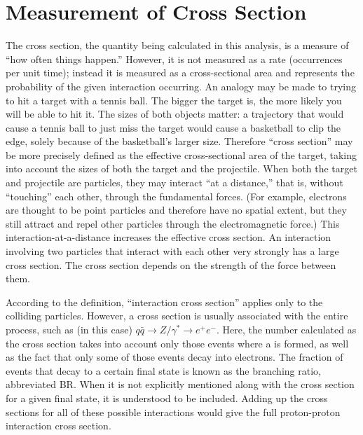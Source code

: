\section{Measurement of Cross Section}
\label{over:xsec}

The cross section, the quantity being calculated in this analysis, 
is a measure of ``how often things happen.''  
However, it is not measured as a rate (occurrences per unit time); 
instead it is measured as a cross-sectional area 
and represents the probability of the given interaction occurring.  
An analogy may be made to trying to hit a target with a tennis ball.  
The bigger the target is, the more likely you will be able to hit it.  
The sizes of both objects matter: 
a trajectory that would cause a tennis ball to just miss the target 
would cause a basketball to clip the edge, 
solely because of the basketball's larger size.  
Therefore ``cross section'' may be more precisely defined as the 
effective cross-sectional area of the target, 
taking into account the sizes of both the target and the projectile.  
When both the target and projectile are particles, %
they may interact ``at a distance,'' that is, without ``touching'' each other, 
through the fundamental forces.  
(For example, electrons are thought to be point particles 
and therefore have no spatial extent, 
but they still attract and repel other particles 
through the electromagnetic force.) 
This interaction-at-a-distance increases the effective cross section.  
An interaction involving two particles that 
interact with each other very strongly has a large cross section.  
The cross section depends on the strength of the force between them.  

According to the definition, ``interaction cross section'' applies only to 
the colliding particles. %
However, a cross section is usually associated with the entire process, 
such as (in this case) 
$ q\bar{q} \rightarrow Z/ \gamma^{*} \rightarrow e^{+} e^{-} $.  %
Here, the number calculated as the cross section takes into account 
only those events where a \Zg is formed, 
as well as the fact that only some of those events decay into electrons.  
The fraction of events that decay to a certain final state is known as 
the branching ratio, abbreviated BR.  
When it is not explicitly mentioned along with the cross section 
for a given final state, it is understood to be included.  
Adding up the cross sections for all of these possible interactions 
would give the full proton-proton interaction cross section.  

